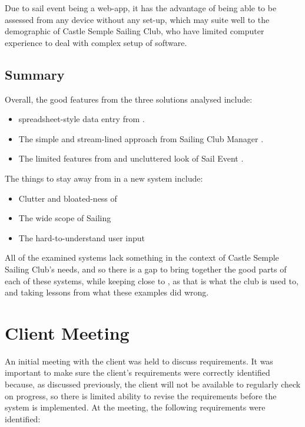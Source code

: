 \documentclass{l4proj}
\begin{document}
Due to sail event being a web-app, it has the advantage of being able to be assessed from any device without any set-up, which may suite well to the demographic of Castle Semple Sailing Club, who have limited computer experience to deal with complex setup of software.

\subsection{Summary}

Overall, the good features from the three solutions analysed include:
\begin{itemize}
    \item
    spreadsheet-style data entry from \citet{sailwave}.
    \item
    The simple and stream-lined approach from Sailing Club Manager \citet{ClubManager}.
    \item
    The limited features from and uncluttered look of Sail Event \citet{SailEvent}.
\end{itemize}

The things to stay away from in a new system include:
\begin{itemize}
    \item
    Clutter and bloated-ness of \citet{sailwave} 
    \item
    The wide scope of Sailing \citet{ClubManager}
    \item
    The hard-to-understand user input \citet{SailEvent}
\end{itemize}

All of the examined systems lack something in the context of Castle Semple Sailing Club’s needs, and so there is a gap to bring together the good parts of each of these systems, while keeping close to \citet{sailwave}, as that is what the club is used to, and taking lessons from what these examples did wrong.

\section{Client Meeting}

An initial meeting with the client was held to discuss requirements. It was important to make sure the client’s requirements were correctly identified because, as discussed previously, the client will not be available to regularly check on progress, so there is limited ability to revise the requirements before the system is implemented.  At the meeting, the following requirements were identified:
\end{document}

